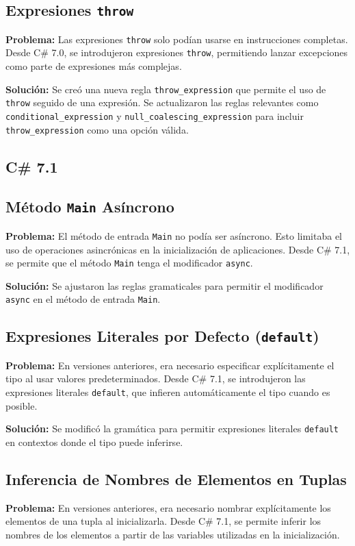 \subsection*{Expresiones \texttt{throw}}
\textbf{Problema:} Las expresiones \texttt{throw} solo podían usarse en instrucciones completas. Desde C\# 7.0, se introdujeron expresiones \texttt{throw}, permitiendo lanzar excepciones como parte de expresiones más complejas.

\textbf{Solución:} Se creó una nueva regla \texttt{throw\_expression} que permite el uso de \texttt{throw} seguido de una expresión. Se actualizaron las reglas relevantes como \texttt{conditional\_expression} y \texttt{null\_coalescing\_expression} para incluir \texttt{throw\_expression} como una opción válida.


\subsection{C\# 7.1}

\subsection*{Método \texttt{Main} Asíncrono}
\textbf{Problema:} El método de entrada \texttt{Main} no podía ser asíncrono. Esto limitaba el uso de operaciones asincrónicas en la inicialización de aplicaciones. Desde C\# 7.1, se permite que el método \texttt{Main} tenga el modificador \texttt{async}.

\textbf{Solución:} Se ajustaron las reglas gramaticales para permitir el modificador \texttt{async} en el método de entrada \texttt{Main}.

\subsection*{Expresiones Literales por Defecto (\texttt{default})}
\textbf{Problema:} En versiones anteriores, era necesario especificar explícitamente el tipo al usar valores predeterminados. Desde C\# 7.1, se introdujeron las expresiones literales \texttt{default}, que infieren automáticamente el tipo cuando es posible.

\textbf{Solución:} Se modificó la gramática para permitir expresiones literales \texttt{default} en contextos donde el tipo puede inferirse.

\subsection*{Inferencia de Nombres de Elementos en Tuplas}
\textbf{Problema:} En versiones anteriores, era necesario nombrar explícitamente los elementos de una tupla al inicializarla. Desde C\# 7.1, se permite inferir los nombres de los elementos a partir de las variables utilizadas en la inicialización.

